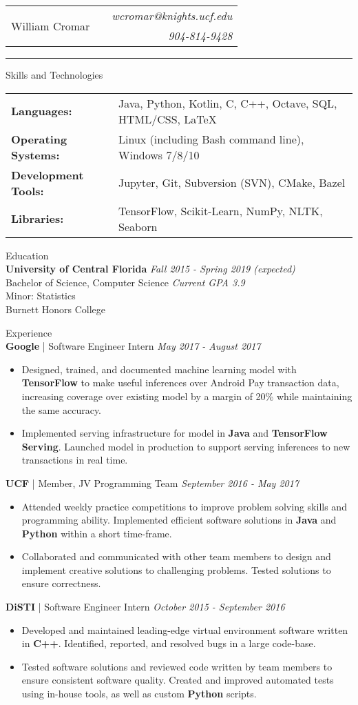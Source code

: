 \documentclass[letterpaper,11pt,oneside]{article}
\newcommand{\mkheader}[3]{
  {\fontfamily{pag}\selectfont
  \begin{tabularx}{\textwidth}{lXr}
    \multirow{2}{*}{\Huge #1} && \emph{#2}
    \\ && \emph{#3}
  \end{tabularx}
  }
  \vspace{2pt}
  \hrule
}
\newcommand{\resheader}[2][]{
  \vspace{9pt}
  {\LARGE #2} #1
  \\
}
\newcommand{\ressubheader}[3][]{
  \vspace{6pt}
  {\large \textbf{#2} #1} \hfill \emph{#3}
  \\
}
\newcommand{\resskill}[1]{\textbf{#1}}
\begin{document}
\mkheader{William Cromar}{wcromar@knights.ucf.edu}{904-814-9428}

\resheader{Skills and Technologies}
\vspace{6pt}
\begin{tabular}{>{\bfseries}l@{\hskip .25cm} l}
  Languages: & Java, Python, Kotlin,  C, C++, Octave, SQL, HTML/CSS, LaTeX \\
  Operating Systems: & Linux (including Bash command line), Windows 7/8/10 \\
  Development Tools: & Jupyter, Git, Subversion (SVN), CMake, Bazel \\
  Libraries: & TensorFlow, Scikit-Learn, NumPy, NLTK, Seaborn
\end{tabular}


\resheader{Education}
\ressubheader{University of Central Florida}{Fall 2015 - Spring 2019 (expected)}
Bachelor of Science, Computer Science \hfill \emph{Current GPA 3.9} \\
Minor: Statistics \\
Burnett Honors College

\resheader{Experience}
\ressubheader[| Software Engineer Intern]{Google}{May 2017 - August 2017}
\begin{itemize}
  \item Designed, trained, and documented machine learning model with \resskill{TensorFlow} to make useful inferences over Android Pay transaction data, increasing coverage over existing model by a margin of 20\% while maintaining the same accuracy.
  \item Implemented serving infrastructure for model in \resskill{Java} and \resskill{TensorFlow Serving}. Launched model in production to support serving inferences to new transactions in real time.
\end{itemize}

\ressubheader[| Member, JV Programming Team]{UCF}{September 2016 - May 2017}
\begin{itemize}
  \item Attended weekly practice competitions to improve problem solving skills and programming ability. Implemented efficient software solutions in \resskill{Java} and \resskill{Python} within a short time-frame. 
  \item Collaborated and communicated with other team members to design and implement creative solutions to challenging problems. Tested solutions to ensure correctness.
\end{itemize}

\ressubheader[| Software Engineer Intern]{DiSTI}{October 2015 - September 2016}
\begin{itemize}
  \item Developed and maintained leading-edge virtual environment software written in \resskill{C++}. Identified, reported, and resolved bugs in a large code-base.
  \item Tested software solutions and reviewed code written by team members to ensure consistent software quality. Created and improved automated tests using in-house tools, as well as custom \resskill{Python} scripts.
\end{itemize}
\end{document}
